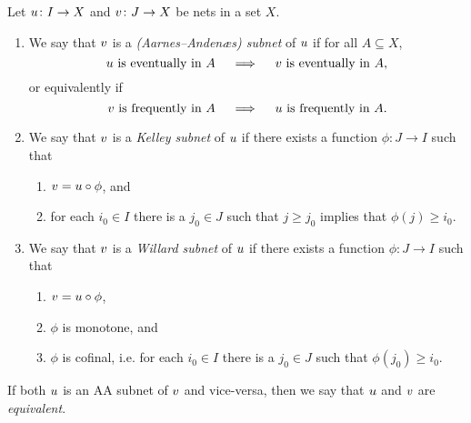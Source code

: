 \documentclass[article, a4paper, 11pt, oneside]{memoir}
\numberwithin{equation}{chapter}
\theoremstyle{nonumberplain}
\begin{document}
\begin{definition}[Subnets]
    \label{def:subnets}
    Let $u \colon I \to X$ and $v \colon J \to X$ be nets in a set $X$.
    
    \begin{enumerate}
        \item We say that $v$ is a \emph{(Aarnes--Andenæs) subnet} of $u$ if for all $A \subseteq X$,
        \begin{equation*}
            \text{$u$ is eventually in $A$}
            \quad \implies \quad
            \text{$v$ is eventually in $A$},
        \end{equation*}
        or equivalently if
        \begin{equation*}
            \text{$v$ is frequently in $A$}
            \quad \implies \quad
            \text{$u$ is frequently in $A$}.
        \end{equation*}

        \item We say that $v$ is a \emph{Kelley subnet} of $u$ if there exists a function $\phi \colon J \to I$ such that
        \begin{enumerate}
            \item $v = u \circ \phi$, and
            \item for each $i_0 \in I$ there is a $j_0 \in J$ such that $j \geq j_0$ implies that $\phi(j) \geq i_0$.
        \end{enumerate}

        \item We say that $v$ is a \emph{Willard subnet} of $u$ if there exists a function $\phi \colon J \to I$ such that
        \begin{enumerate}
            \item $v = u \circ \phi$,
            \item $\phi$ is monotone, and
            \item $\phi$ is cofinal, i.e. for each $i_0 \in I$ there is a $j_0 \in J$ such that $\phi(j_0) \geq i_0$.
        \end{enumerate}
    \end{enumerate}
\end{definition}
%
If both $u$ is an AA subnet of $v$ and vice-versa, then we say that $u$ and $v$ are \emph{equivalent}.
\end{document}
